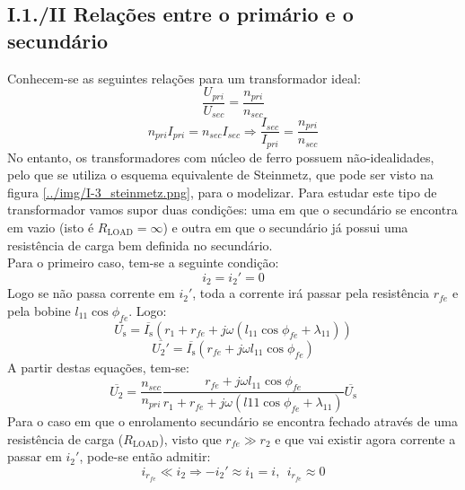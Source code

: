 \documentclass[%
  reprint,
  nofootinbib,
  amsmath,amssymb,
  aps,
  10pt,
]{revtex4-1}
\begin{document}
\subsection*{I.1./II Relações entre o primário e o secundário}
Conhecem-se as seguintes relações para um transformador ideal:
\begin{equation}
\frac{U_{pri}}{U_{sec}}=\frac{n_{pri}}{n_{sec}}
\label{eq:trans_volt}
\end{equation}
\begin{equation}
n_{pri}I_{pri}=n_{sec}I_{sec} \Rightarrow \frac{I_{sec}}{I_{pri}}=\frac{n_{pri}}{n_{sec}}
\label{eq:trans_corr}
\end{equation}
No entanto, os transformadores com núcleo de ferro possuem não-idealidades, pelo que se utiliza o esquema equivalente de Steinmetz, que pode ser visto na figura \ref{../img/I-3_steinmetz.png}, para o modelizar. Para estudar este tipo de transformador vamos supor duas condições: uma em que o secundário se encontra em vazio (isto é $R_{\mathrm{LOAD}}=\infty$) e outra em que o secundário já possui uma resistência de carga bem definida no secundário.\\
Para o primeiro caso, tem-se a seguinte condição:
\begin{equation}
i_2=i_2'=0
\end{equation}
Logo se não passa corrente em $i_2'$, toda a corrente irá passar pela resistência $r_{fe}$ e pela bobine $l_11\cos \phi_{fe}$. Logo:
\begin{equation}
\overline{U_{\mathrm{s}}}=\overline{I_{\mathrm{s}}}(r_1+r_{fe}+j\omega(l_{11}\cos \phi_{fe}+\lambda_{11}))
\end{equation}
\begin{equation}
\overline{U_2'}=\overline{I_{\mathrm{s}}} (r_{fe}+j\omega l_{11}\cos \phi_{fe})
\end{equation}
A partir destas equações, tem-se:
\begin{equation}
\overline{U_2}=\frac{n_{sec}}{n_{pri}}\frac{r_{fe}+j\omega l_{11}\cos \phi_{fe}}{r_1+r_{fe}+j\omega(l11\cos \phi_{fe}+\lambda_{11})}\overline{U_\mathrm{s}}
\label{eq:aberto}
\end{equation}
Para o caso em que o enrolamento secundário se encontra fechado através de uma resistência de carga ($R_{\mathrm{LOAD}}$), visto que $r_{fe}\gg r_2$ e que vai existir agora corrente a passar em $i_2'$, pode-se então admitir:
\begin{equation}
i_{r_{fe}}\ll i_2 \Rightarrow -i_2'\approx i_1=i,\ \ i_{r_{fe}}\approx 0
\end{equation}
\end{document}

